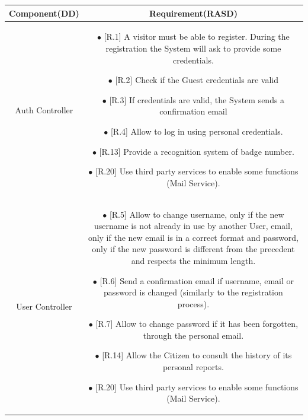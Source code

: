 \documentclass{report}
\begin{document}
\begin{tabularx}{\linewidth}{| c || c |}
    \hline
    \endfoot

    \hline
\textbf{Component(DD)} & \textbf{Requirement(RASD)}\\
	\hline
	\hline
    \large{Auth Controller} & \parbox{0.45\textwidth}{ \vspace{2mm}
    $\bullet$ {[R.1]} A visitor must be able to register. During the registration the System will ask to provide some credentials. \\

	 $\bullet$ {[R.2]} Check if the Guest credentials are valid \\

	 $\bullet$ {[R.3]} If credentials are valid, the System sends a confirmation email \\

	 $\bullet$ {[R.4]} Allow to log in using personal credentials. \\

     $\bullet$ {[R.13]} Provide a recognition system of badge number.\\
     
    $\bullet$ {[R.20]} Use third party services to enable some functions (Mail Service).\\}\\
        
    \hline
    \large{User Controller} & \parbox{0.45\textwidth}{ \vspace{2mm} 
    $\bullet$ {[R.5]} Allow to change username, only if the new username is not already in use by another User, email, only if the new email is in a correct format and password, only if the new password is different from the precedent and respects the minimum length. \\

	$\bullet$ {[R.6]} Send a confirmation email if username, email or password is changed (similarly to the registration process). \\

	$\bullet$ {[R.7]} Allow to change password if it has been forgotten, through the personal email. \\

    $\bullet$ {[R.14]} Allow the Citizen to consult the history of its personal reports.\\
    
    $\bullet$ {[R.20]} Use third party services to enable some functions (Mail Service).\\} \\


\end{tabularx}
\end{document}
